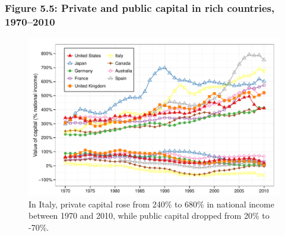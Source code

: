 \documentclass[t]{beamer}\usepackage[]{graphicx}\usepackage[]{color}
\newenvironment{knitrout}{}{} %
\begin{document}
\begin{frame}[label=Figure_5_5]
\frametitle{Figure 5.5: Private and public capital in rich countries, 1970--2010}
\begin{figure}[t]
\begin{minipage}[b]{\textwidth}
\centering
\begin{knitrout}\footnotesize
{}\color{fgcolor}

{\centering \includegraphics[width=1\linewidth]{figures/color/Figure_5_5} 

}



\end{knitrout}
\caption{In Italy, private capital rose from 240\% to 680\% in national income between 1970 and 2010, while public capital dropped from 20\% to -70\%.}
\end{minipage}
\end{figure}
\end{frame}
\end{document}
